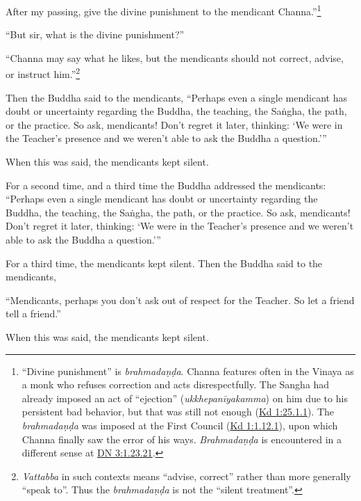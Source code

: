 \documentclass[12pt,openany]{book}%
\begin{document}
After my passing, give the divine punishment to the mendicant Channa.”\footnote{“Divine punishment” is \textit{\textsanskrit{brahmadaṇḍa}}. Channa features often in the Vinaya as a monk who refuses correction and acts disrespectfully. The Sangha had already imposed an act of “ejection” (\textit{\textsanskrit{ukkhepanīyakamma}}) on him due to his persistent bad behavior, but that was still not enough (\href{https://suttacentral.net/pli-tv-kd1/en/sujato\#25.1.1}{Kd 1:25.1.1}). The \textit{\textsanskrit{brahmadaṇḍa}} was imposed at the First Council (\href{https://suttacentral.net/pli-tv-kd1/en/sujato\#1.12.1}{Kd 1:1.12.1}), upon which Channa finally saw the error of his ways. \textit{\textsanskrit{Brahmadaṇḍa}} is encountered in a different sense at \href{https://suttacentral.net/dn3/en/sujato\#1.23.21}{DN 3:1.23.21}. } 

“But sir, what is the divine punishment?” 

“Channa may say what he likes, but the mendicants should not correct, advise, or instruct him.”\footnote{\textit{Vattabba} in such contexts means “advise, correct” rather than more generally “speak to”. Thus the \textit{\textsanskrit{brahmadaṇḍa}} is not the “silent treatment”. } 

Then the Buddha said to the mendicants, “Perhaps even a single mendicant has doubt or uncertainty regarding the Buddha, the teaching, the \textsanskrit{Saṅgha}, the path, or the practice. So ask, mendicants! Don’t regret it later, thinking: ‘We were in the Teacher’s presence and we weren’t able to ask the Buddha a question.’” 

When this was said, the mendicants kept silent. 

For a second time, and a third time the Buddha addressed the mendicants: “Perhaps even a single mendicant has doubt or uncertainty regarding the Buddha, the teaching, the \textsanskrit{Saṅgha}, the path, or the practice. So ask, mendicants! Don’t regret it later, thinking: ‘We were in the Teacher’s presence and we weren’t able to ask the Buddha a question.’” 

For a third time, the mendicants kept silent. Then the Buddha said to the mendicants, 

“Mendicants, perhaps you don’t ask out of respect for the Teacher. So let a friend tell a friend.” 

When this was said, the mendicants kept silent. 
\end{document}
